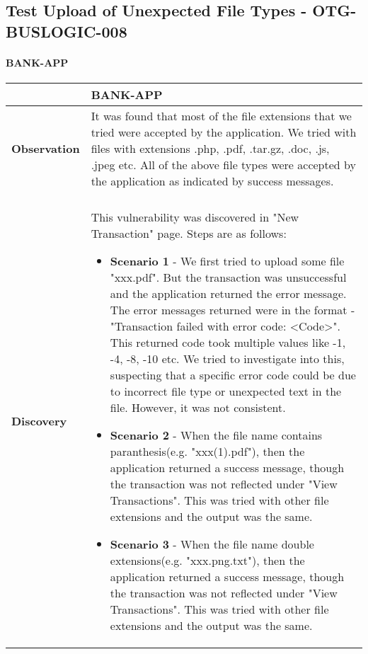 \subsection{Test Upload of Unexpected File Types - OTG-BUSLOGIC-008}
\paragraph{BANK-APP} \mbox{}
\begin{longtable*}{p{.20\textwidth} | p{.80\textwidth}}
    \hline
    & \textbf{BANK-APP} \\
    \hline
    \textbf{Observation} &
      It was found that most of the file extensions that we tried were accepted by the application. We tried with files with extensions .php, .pdf, .tar.gz, .doc, .js, .jpeg etc. All of the above file types were accepted by the application as indicated by success messages.
    \\\\
    \textbf{Discovery} &
        This vulnerability was discovered in "New Transaction" page. Steps are as follows:
        \begin{itemize}
         \item \textbf{Scenario 1} - We first tried to upload some file "xxx.pdf". But the transaction was unsuccessful and the application returned the error message. 
         The error messages returned were in the format - "Transaction failed with error code: <Code>". This returned code took multiple values like -1, -4, -8, -10 etc. We tried to investigate into this, suspecting that a specific error code could be due to incorrect file type or unexpected text in the file. However, it was not consistent. 

         \item \textbf{Scenario 2} - When the file name contains paranthesis(e.g. "xxx(1).pdf"), then the application returned a success message, though the transaction was not reflected under "View Transactions". This was tried with other file extensions and the output was the same.

         \item \textbf{Scenario 3} - When the file name double extensions(e.g. "xxx.png.txt"), then the application returned a success message, though the transaction was not reflected under "View Transactions". This was tried with other file extensions and the output was the same.
        \end{itemize}


\end{longtable*}
